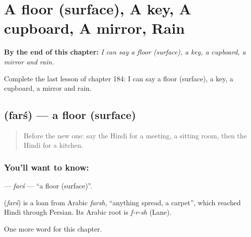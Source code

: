 
\chapter{A floor (surface), A key, A cupboard, A mirror, Rain}
\label{ch:hi-a-floor-surface-a-key-a-cupboard-a-mirror-rain}

\begin{chapteropening}
\textbf{By the end of this chapter:} \emph{I can say a floor (surface), a key, a cupboard, a mirror and rain.}

Complete the last lesson of chapter 184: I can say a floor (surface), a key, a cupboard, a mirror and rain.
\end{chapteropening}

\section[\texorpdfstring{\hi{फ़र्श} (farś)}{फ़र्श (farś)}]{ (farś) — a floor (surface)}

\label{lesson:HI-C184-fars}



\begin{quote}
Before the new one: say the Hindi for a meeting, a sitting room, then the Hindi for a kitchen.
\end{quote}

\subsection*{You'll want to know: }
\textbf{} — \emph{farś} — \textquotedblleft{}a floor (surface)\textquotedblright{}.

\begin{cousinweb}
\textbf{} (\emph{farś}) is a loan from Arabic \emph{farsh}, \textquotedblleft{}anything spread, a carpet\textquotedblright{}, which reached Hindi through Persian. Its Arabic root is \emph{f-r-sh} (Lane).
\end{cousinweb}

\begin{grammarlens}[title={What you've built}]
One more word for this chapter.
\end{grammarlens}


